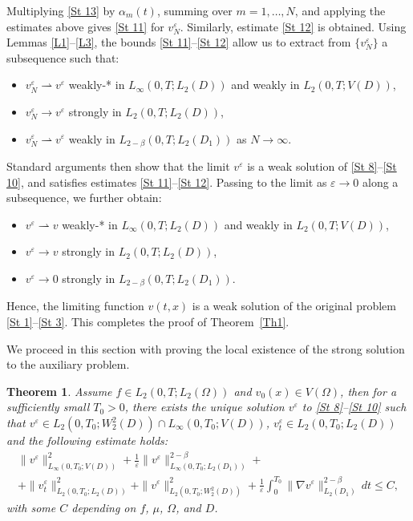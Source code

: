 \documentclass[11pt]{article}
\newtheorem{theorem}{Theorem}
\begin{document}
Multiplying \eqref{St 13} by $\alpha_m(t)$, summing over $m = 1,\dots,N$, and applying the estimates above gives \eqref{St 11} for $v_N^\varepsilon$.  
Similarly, estimate \eqref{St 12} is obtained.  
Using Lemmas \ref{L1}--\ref{L3}, the bounds \eqref{St 11}--\eqref{St 12} allow us to extract from $\{v_N^\varepsilon\}$ a subsequence such that:
\begin{itemize}
	\item $v_N^\varepsilon \rightharpoonup v^\varepsilon$ weakly-* in $L_\infty(0,T;L_2(D))$ and weakly in $L_2(0,T;V(D))$,
	\item $v_N^\varepsilon \to v^\varepsilon$ strongly in $L_2(0,T;L_2(D))$,
	\item $v_N^\varepsilon \rightharpoonup v^\varepsilon$ weakly in $L_{2-\beta}(0,T;L_2(D_1))$ as $N \to \infty$.
\end{itemize}

Standard arguments then show that the limit $v^\varepsilon$ is a weak solution of \eqref{St 8}--\eqref{St 10}, and satisfies estimates \eqref{St 11}--\eqref{St 12}.  
Passing to the limit as $\varepsilon \to 0$ along a subsequence, we further obtain:
\begin{itemize}
	\item $v^\varepsilon \rightharpoonup v$ weakly-* in $L_\infty(0,T;L_2(D))$ and weakly in $L_2(0,T;V(D))$,
	\item $v^\varepsilon \to v$ strongly in $L_2(0,T;L_2(D))$,
	\item $v^\varepsilon \to 0$ strongly in $L_{2-\beta}(0,T;L_2(D_1))$.
\end{itemize}

Hence, the limiting function $v(t,x)$ is a weak solution of the original problem \eqref{St 1}--\eqref{St 3}.  
This completes the proof of Theorem~\ref{Th1}.


We proceed in this section with proving the local existence of the strong solution to the auxiliary problem. 

\begin{theorem} Assume $f \in L_2(0, T; L_2(\Omega))$ and $v_0(x) \in V(\Omega)$, then for  a sufficiently small  $ T_0>0$, there exists the unique solution $ v^{\varepsilon}$ to \eqref{St 8}--\eqref{St 10} such that 
	$ v^{\varepsilon}\in L_2 (0,T_0; W^{2}_{2} (D))\cap L_\infty (0,T_0; V(D))$, $v^{\varepsilon}_{t}\in L_2 (0,T_0 ; L_2 (D))$ and   the following estimate holds: 
\begin{multline} \label{St 15}
\| v^{\varepsilon} \|^{2}_{L_\infty (0,T_0; V(D))} + \frac{1}{\varepsilon} \|v^{\varepsilon} \|^{2 - \beta}_{L_\infty (0,T_0; L_2 (D_1))} + \\
+ \|v^{\varepsilon}_{t} \|^{2}_{L_2 (0,T_0 ; L_2 (D))} 
+ \| v^{\varepsilon} \|^{2}_{L_2 (0,T_0; W^{2}_{2} (D))} 
+ \frac{1}{\varepsilon} \int_{0}^{T_0} \|\nabla v^{\varepsilon} \|^{2-\beta}_{L_2 (D_1)} \, dt 
\leq C,
\end{multline}
{with some $C$ depending on $f$, $\mu$, $\Omega$, and $D$.}
\end{theorem}
\end{document}
